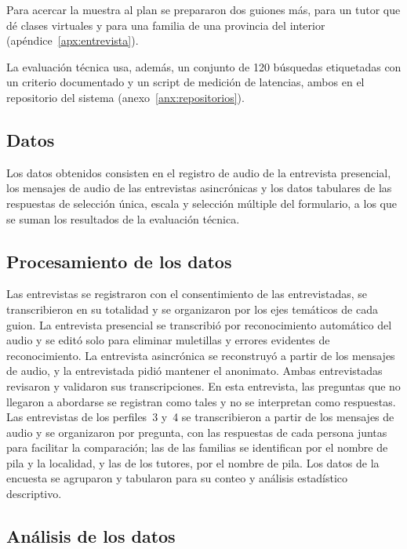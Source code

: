 Para acercar la muestra al plan se prepararon dos guiones más, para un
tutor que dé clases virtuales y para una familia de una provincia del
interior (apéndice~\ref{apx:entrevista}).

La evaluación técnica usa, además, un conjunto de 120 búsquedas
etiquetadas con un criterio documentado y un script de medición de
latencias, ambos en el repositorio del sistema
(anexo~\ref{anx:repositorios}).

\subsection{Datos}

Los datos obtenidos consisten en el registro de audio de la entrevista
presencial, los mensajes de audio de las entrevistas asincrónicas y los
datos tabulares de las respuestas de selección única, escala y selección
múltiple del formulario, a los que se suman los resultados de la
evaluación técnica.

\subsection{Procesamiento de los datos}

Las entrevistas se registraron con el consentimiento de las
entrevistadas, se transcribieron en su totalidad y se organizaron por
los ejes temáticos de cada guion. La entrevista presencial se transcribió
por reconocimiento automático del audio y se editó solo para eliminar
muletillas y errores evidentes de reconocimiento. La entrevista
asincrónica se reconstruyó a partir de los mensajes de audio, y la
entrevistada pidió mantener el anonimato. Ambas entrevistadas revisaron
y validaron sus transcripciones. En esta entrevista, las preguntas que no llegaron a abordarse
se registran como tales y no se interpretan como respuestas. Las
entrevistas de los perfiles~3 y~4 se transcribieron a partir de los
mensajes de audio y se organizaron por pregunta, con las respuestas de
cada persona juntas para facilitar la comparación; las de las familias
se identifican por el nombre de pila y la localidad, y las de los tutores,
por el nombre de pila. Los datos
de la encuesta se agruparon y tabularon para su conteo y análisis
estadístico descriptivo.

\subsection{Análisis de los datos}


